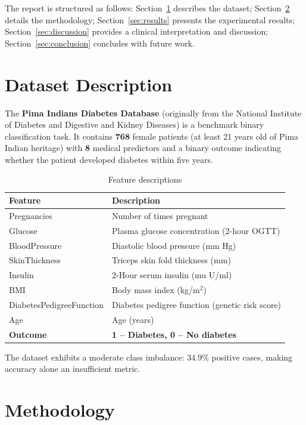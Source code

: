\documentclass[12pt,a4paper]{article}
\begin{document}
The report is structured as follows: Section~\ref{sec:dataset} describes the dataset; Section~\ref{sec:methodology} details the methodology; Section~\ref{sec:results} presents the experimental results; Section~\ref{sec:discussion} provides a clinical interpretation and discussion; Section~\ref{sec:conclusion} concludes with future work.

\section{Dataset Description}
\label{sec:dataset}

The \textbf{Pima Indians Diabetes Database} (originally from the National Institute of Diabetes and Digestive and Kidney Diseases) is a benchmark binary classification task. It contains \textbf{768} female patients (at least 21 years old of Pima Indian heritage) with \textbf{8} medical predictors and a binary outcome indicating whether the patient developed diabetes within five years.

\begin{table}[H]
\centering
\caption{Feature descriptions}
\label{tab:features}
\begin{tabular}{ll}
\toprule
\textbf{Feature} & \textbf{Description} \\
\midrule
Pregnancies & Number of times pregnant \\
Glucose & Plasma glucose concentration (2-hour OGTT) \\
BloodPressure & Diastolic blood pressure (mm Hg) \\
SkinThickness & Triceps skin fold thickness (mm) \\
Insulin & 2-Hour serum insulin (mu U/ml) \\
BMI & Body mass index (kg/m$^2$) \\
DiabetesPedigreeFunction & Diabetes pedigree function (genetic risk score) \\
Age & Age (years) \\
\textbf{Outcome} & \textbf{1 -- Diabetes, 0 -- No diabetes} \\
\bottomrule
\end{tabular}
\end{table}

The dataset exhibits a moderate class imbalance: 34.9\% positive cases, making accuracy alone an insufficient metric.

\section{Methodology}
\label{sec:methodology}
\end{document}

